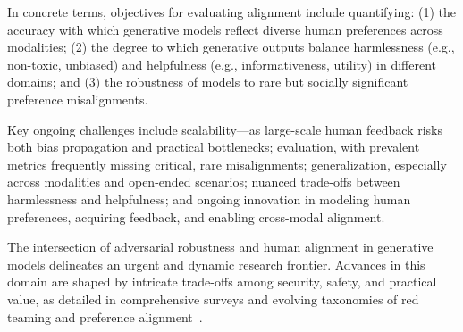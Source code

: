 \documentclass[sigconf]{acmart}
\begin{document}
In concrete terms, objectives for evaluating alignment include quantifying: (1) the accuracy with which generative models reflect diverse human preferences across modalities; (2) the degree to which generative outputs balance harmlessness (e.g., non-toxic, unbiased) and helpfulness (e.g., informativeness, utility) in different domains; and (3) the robustness of models to rare but socially significant preference misalignments.

Key ongoing challenges include scalability—as large-scale human feedback risks both bias propagation and practical bottlenecks; evaluation, with prevalent metrics frequently missing critical, rare misalignments; generalization, especially across modalities and open-ended scenarios; nuanced trade-offs between harmlessness and helpfulness; and ongoing innovation in modeling human preferences, acquiring feedback, and enabling cross-modal alignment.

The intersection of adversarial robustness and human alignment in generative models delineates an urgent and dynamic research frontier. Advances in this domain are shaped by intricate trade-offs among security, safety, and practical value, as detailed in comprehensive surveys and evolving taxonomies of red teaming and preference alignment~\cite{ref67,ref69,ref75,ref85}.
\end{document}

